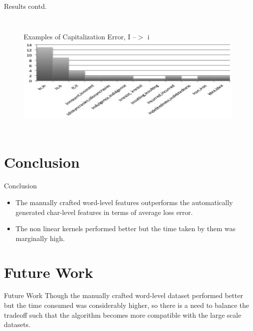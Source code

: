 \documentclass{beamer}
\begin{document}
\begin{frame}{Results contd.}
\begin{columns}
\begin{figure}[ht]
\begin{center}
Examples of Capitalization Error, I --$>$ i
\includegraphics[height=1.5 in]{images/I_i.jpg}
\end{center}
\end{figure}
\end{columns}
\end{frame}

\section{Conclusion}
\begin{frame}{Conclusion}
\begin{itemize}
\item The manually crafted word-level features outperforms the automatically generated char-level features in terms of average loss error.
\item The non linear kernels performed better but the time taken by them was marginally high.
\end{itemize}
\end{frame}

\section{Future Work}
\begin{frame}{Future Work}
Though the manually crafted word-level dataset performed better but the time consumed was considerably higher, so there is a need to balance the tradeoff such that the algorithm becomes more compatible with the large scale datasets.
\end{frame}
\end{document}
